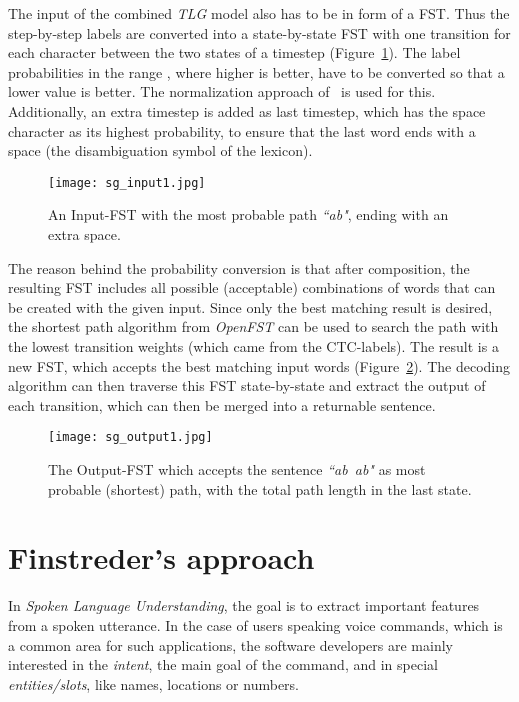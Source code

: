 \documentclass[a4paper]{article}
\begin{document}
\vspace{9pt}
The input of the combined \textit{TLG} model also has to be in form of a FST. Thus the step-by-step labels are converted into a state-by-state FST with one transition for each character between the two states of a timestep (Figure~\ref{fig:sg_input1}). The label probabilities in the range , where higher is better, have to be converted so that a lower value is better. The normalization approach of~\cite{GSAMP} is used for this. Additionally, an extra timestep is added as last timestep, which has the space character as its highest probability, to ensure that the last word ends with a space (the disambiguation symbol of the lexicon).

\begin{figure}[H]
	\centering
	\texttt{[image: sg\_input1.jpg]}
	\caption{An Input-FST with the most probable path \textit{``ab"}, ending with an extra space.}
	\label{fig:sg_input1}
\end{figure}

The reason behind the probability conversion is that after composition, the resulting FST includes all possible (acceptable) combinations of words that can be created with the given input. Since only the best matching result is desired, the shortest path algorithm from \textit{OpenFST} can be used to search the path with the lowest transition weights (which came from the CTC-labels). The result is a new FST, which accepts the best matching input words (Figure~\ref{fig:sg_output1}). The decoding algorithm can then traverse this FST state-by-state and extract the output of each transition, which can then be merged into a returnable sentence.

\begin{figure}[H]
	\centering
	\texttt{[image: sg\_output1.jpg]}
	\caption{The Output-FST which accepts the sentence \textit{``ab~ab"} as most probable (shortest) path, with the total path length in the last state.}
	\label{fig:sg_output1}
\end{figure}



\section{Finstreder's approach}
\label{sec:sluap}

In \textit{Spoken Language Understanding}, the goal is to extract important features from a spoken utterance. In the case of users speaking voice commands, which is a common area for such applications, the software developers are mainly interested in the \textit{intent}, the main goal of the command, and in special \mbox{\textit{entities/slots}}, like names, locations or numbers. 
\end{document}
